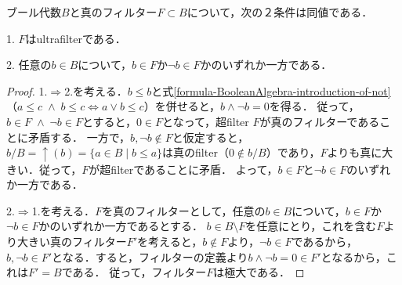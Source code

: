\documentclass[uplatex, 12pt, dvipdfmx]{jsarticle}
\begin{document}
\vspace{1cm}

\begin{proposition*}[ブール代数上のultrafilterの同値な条件]
    ブール代数$B$と真のフィルター$F\subset B$について，次の２条件は同値である．

    1. $F$はultrafilterである．

    2. 任意の$b\in B$について，$b\in F$か$\lnot b\in F$かのいずれか一方である．
\end{proposition*}
\begin{proof}
    1.$\Rightarrow$2.を考える．$b\le b$と式\ref{formula-BooleanAlgebra-introduction-of-not}（$a\le c\;\land\; b\le c\Leftrightarrow a\lor b\le c$）を併せると，$b\land\lnot b=0$を得る．
    従って，$b\in F\;\land\; \lnot b\in F$とすると，$0\in F$となって，超filter $F$が真のフィルターであることに矛盾する．
    一方で，$b,\lnot b\notin F$と仮定すると，$b/B=\uparrow (b)=\{a\in B\mid b\le a\}$は真のfilter（$0\notin b/B$）であり，$F$よりも真に大きい．従って，$F$が超filterであることに矛盾．
    よって，$b\in F$と$\lnot b\in F$のいずれか一方である．
    
    2.$\Rightarrow$1.を考える．$F$を真のフィルターとして，任意の$b\in B$について，$b\in F$か$\lnot b\in F$かのいずれか一方であるとする．
    $b\in B\setminus F$を任意にとり，これを含む$F$より大きい真のフィルター$F'$を考えると，$b\notin F$より，$\lnot b\in F$であるから，$b,\lnot b\in F'$となる．すると，フィルターの定義より$b\land \lnot b=0\in F'$となるから，これは$F'=B$である．
    従って，フィルター$F$は極大である．
\end{proof}
\vspace{3cm}
\end{document}
